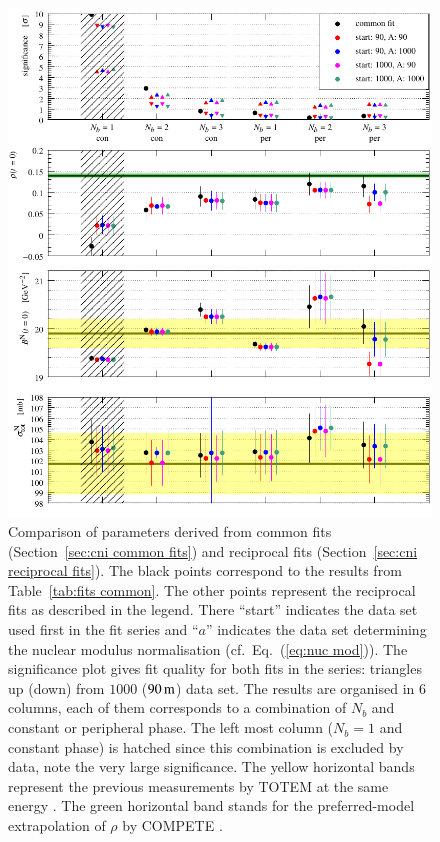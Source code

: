 \begin{figure}
\begin{center}
\includegraphics{fig/fits_reciprocal_derived.pdf}
\caption{%
Comparison of parameters derived from common fits (Section~\ref{sec:cni common fits}) and reciprocal fits (Section~\ref{sec:cni reciprocal fits}). The black points correspond to the results from Table~\ref{tab:fits common}. The other points represent the reciprocal fits as described in the legend. There ``start'' indicates the data set used first in the fit series and ``$a$'' indicates the data set determining the nuclear modulus normalisation (cf.~Eq.~(\ref{eq:nuc mod})). The significance plot gives fit quality for both fits in the series: triangles up (down) from $1000$ ($90\,{\rm m}$) data set. The results are organised in 6 columns, each of them corresponds to a combination of $N_b$ and constant or peripheral phase. The left most column ($N_b = 1$ and constant phase) is hatched since this combination is excluded by data, note the very large significance. The yellow horizontal bands represent the previous measurements by TOTEM at the same energy \cite{prl111}. The green horizontal band stands for the preferred-model extrapolation of $\rho$ by COMPETE \cite{compete}.
}
\label{fig:fits reciprocal der}
\end{center}
\end{figure}
